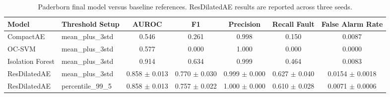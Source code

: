 \begin{table}[t]
\centering
\caption{Paderborn final model versus baseline references. ResDilatedAE results are reported across three seeds.}
\label{tab:paderborn_results}
\begin{tabular}{p{2.2cm} p{2.1cm} c c c c c}
\toprule
Model & Threshold Setup & AUROC & F1 & Precision & Recall Fault & False Alarm Rate \\
\midrule
CompactAE & mean\_plus\_3std & 0.546 & 0.261 & 0.998 & 0.150 & 0.0087 \\
OC-SVM & mean\_plus\_3std & 0.577 & 0.000 & 1.000 & 0.000 & 0.0000 \\
Isolation Forest & mean\_plus\_3std & 0.914 & 0.634 & 0.999 & 0.464 & 0.0083 \\
ResDilatedAE & mean\_plus\_3std & 0.858 $\pm$ 0.013 & 0.770 $\pm$ 0.030 & 0.999 $\pm$ 0.000 & 0.627 $\pm$ 0.040 & 0.0154 $\pm$ 0.0018 \\
ResDilatedAE & percentile\_99\_5 & 0.858 $\pm$ 0.013 & 0.757 $\pm$ 0.022 & 1.000 $\pm$ 0.000 & 0.610 $\pm$ 0.028 & 0.0071 $\pm$ 0.0006 \\
\bottomrule
\end{tabular}
\end{table}
